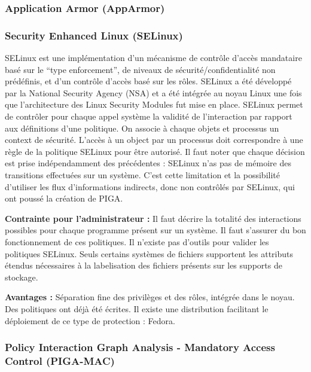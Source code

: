\documentclass[pdftex,a4paper,titlepage,11pt]{article}
\begin{document}
\subsubsection{Application Armor (AppArmor)}

\subsubsection{Security Enhanced Linux (SELinux)}

SELinux est une implémentation d'un mécanisme de contrôle d'accès mandataire basé sur le ``type enforcement'', de niveaux de sécurité/confidentialité non prédéfinis, et d'un contrôle d'accès basé sur les rôles. SELinux a été développé par la National Security Agency (NSA) et a été intégrée au noyau Linux une fois que l'architecture des Linux Security Modules fut mise en place. SELinux permet de contrôler pour chaque appel système la validité de l'interaction par rapport aux définitions d'une politique. On associe à chaque objets et processus un context de sécurité. L'accès à un object par un processus doit correspondre à une règle de la politique SELinux pour être autorisé. Il faut noter que chaque décision est prise indépendamment des précédentes : SELinux n'as pas de mémoire des transitions effectuées sur un système. C'est cette limitation et la possibilité d'utiliser les flux d'informations indirects, donc non contrôlés par SELinux, qui ont poussé la création de PIGA.

\begin{list}{}{}
 \item \textbf{Contrainte pour l'administrateur :} Il faut décrire la totalité des interactions possibles pour chaque programme présent sur un système. Il faut s'assurer du bon fonctionnement de ces politiques. Il n'existe pas d'outils pour valider les politiques SELinux. Seuls certains systèmes de fichiers supportent les attributs étendus nécessaires à la labelisation des fichiers présents sur les supports de stockage.
 \item \textbf{Avantages :} Séparation fine des privilèges et des rôles, intégrée dans le noyau. Des politiques ont déjà été écrites. Il existe une distribution facilitant le déploiement de ce type de protection : Fedora.
\end{list}

\subsubsection{Policy Interaction Graph Analysis - Mandatory Access Control (PIGA-MAC)}
\end{document}
